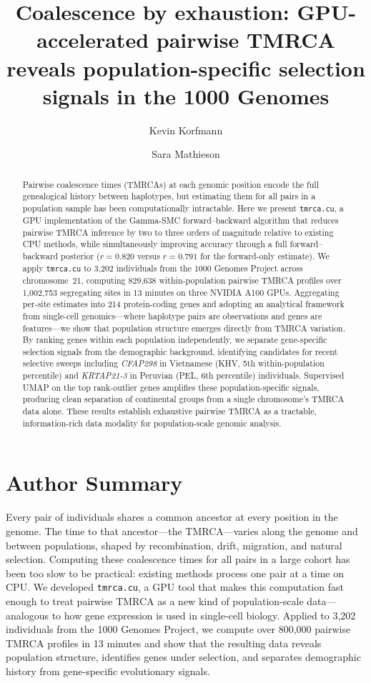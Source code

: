 \documentclass[10pt,letterpaper]{article}
\title{Coalescence by exhaustion: GPU-accelerated pairwise TMRCA reveals population-specific selection signals in the 1000 Genomes}
\author[1]{Kevin Korfmann}
\author[1]{Sara Mathieson}
\affil[1]{Department of Biology, University of Pennsylvania, Philadelphia, PA, USA}
\date{}
\begin{document}
\maketitle

\begin{abstract}
Pairwise coalescence times (TMRCAs) at each genomic position encode the full genealogical history between haplotypes, but estimating them for all pairs in a population sample has been computationally intractable.
Here we present \texttt{tmrca.cu}, a GPU implementation of the Gamma-SMC forward--backward algorithm that reduces pairwise TMRCA inference by two to three orders of magnitude relative to existing CPU methods, while simultaneously improving accuracy through a full forward--backward posterior ($r = 0.820$ versus $r = 0.791$ for the forward-only estimate).
We apply \texttt{tmrca.cu} to 3{,}202 individuals from the 1000 Genomes Project across chromosome~21, computing 829{,}638 within-population pairwise TMRCA profiles over 1{,}002{,}753 segregating sites in 13 minutes on three NVIDIA A100 GPUs.
Aggregating per-site estimates into 214 protein-coding genes and adopting an analytical framework from single-cell genomics---where haplotype pairs are observations and genes are features---we show that population structure emerges directly from TMRCA variation.
By ranking genes within each population independently, we separate gene-specific selection signals from the demographic background, identifying candidates for recent selective sweeps including \textit{CFAP298} in Vietnamese (KHV, 5th within-population percentile) and \textit{KRTAP21-3} in Peruvian (PEL, 6th percentile) individuals.
Supervised UMAP on the top rank-outlier genes amplifies these population-specific signals, producing clean separation of continental groups from a single chromosome's TMRCA data alone.
These results establish exhaustive pairwise TMRCA as a tractable, information-rich data modality for population-scale genomic analysis.
\end{abstract}

\section*{Author Summary}
Every pair of individuals shares a common ancestor at every position in the genome.
The time to that ancestor---the TMRCA---varies along the genome and between populations, shaped by recombination, drift, migration, and natural selection.
Computing these coalescence times for all pairs in a large cohort has been too slow to be practical: existing methods process one pair at a time on CPU.
We developed \texttt{tmrca.cu}, a GPU tool that makes this computation fast enough to treat pairwise TMRCA as a new kind of population-scale data---analogous to how gene expression is used in single-cell biology.
Applied to 3{,}202 individuals from the 1000 Genomes Project, we compute over 800{,}000 pairwise TMRCA profiles in 13 minutes and show that the resulting data reveals population structure, identifies genes under selection, and separates demographic history from gene-specific evolutionary signals.
\end{document}
